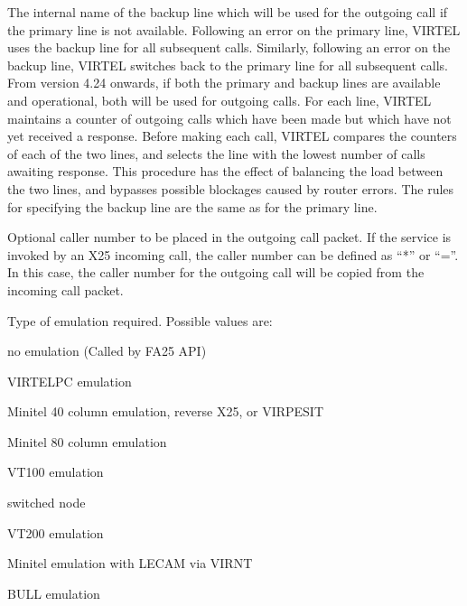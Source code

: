 \documentclass[letterpaper,10pt,english]{sphinxmanual}
\begin{document}
\begin{description}
\sphinxAtStartPar
The internal name of the backup line which will be used for the outgoing call if the primary line is not available. Following an error on the primary line, VIRTEL uses the backup line for all subsequent calls. Similarly, following an error on the backup line, VIRTEL switches back to the primary line for all subsequent calls. From version 4.24 onwards, if both the primary and backup lines are available and operational, both will be used for outgoing calls. For each line, VIRTEL maintains a counter of outgoing calls which have been made but which have not yet received a response. Before making each call, VIRTEL compares the counters of each of the two lines, and selects the line with the lowest number of calls awaiting response. This procedure has the effect of balancing the load between the two lines, and bypasses possible blockages caused by router errors. The rules for specifying the backup line are the same as for the primary line.

\sphinxAtStartPar
Optional caller number to be placed in the outgoing call packet. If the service is invoked by an X25 incoming call, the caller number can be defined as “*” or “=”. In this case, the caller number for the outgoing call will be copied from the incoming call packet.

\sphinxAtStartPar
Type of emulation required. Possible values are:
\begin{description}
\sphinxAtStartPar
no emulation (Called by FA25 API)

\sphinxAtStartPar
VIRTELPC emulation

\sphinxAtStartPar
Minitel 40 column emulation, reverse X25, or VIRPESIT

\sphinxAtStartPar
Minitel 80 column emulation

\sphinxAtStartPar
VT100 emulation

 switched node

\sphinxAtStartPar
VT200 emulation

\sphinxAtStartPar
Minitel emulation with LECAM via VIRNT

\sphinxAtStartPar
BULL emulation

\end{description}


\end{description}
\end{document}
